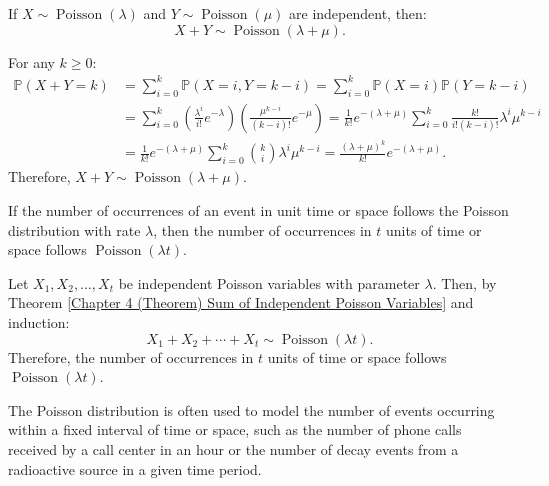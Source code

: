 \documentclass{huhtakm-template-book-v2}
\newcommand{\prob}{\mathbb{P}}
\DeclareMathOperator{\Poisson}{Poisson}
\begin{document}
    \begin{thm}
        \label{Chapter 4 (Theorem) Sum of Independent Poisson Variables}
        If $X \sim \Poisson(\lambda)$ and $Y \sim \Poisson(\mu)$ are independent, then:
        \begin{equation*}
            X+Y \sim \Poisson(\lambda+\mu).
        \end{equation*}
    \end{thm}
    \begin{proofing}
        For any $k \geq 0$:
        \begin{align*}
            \prob(X+Y = k) &= \sum_{i = 0}^{k}\prob(X = i,Y = k-i) = \sum_{i = 0}^{k}\prob(X = i)\prob(Y = k-i)\\
            &= \sum_{i = 0}^{k}\left(\frac{\lambda^{i}}{i!}e^{-\lambda}\right)\left(\frac{\mu^{k-i}}{(k-i)!}e^{-\mu}\right) = \frac{1}{k!}e^{-(\lambda+\mu)}\sum_{i = 0}^{k}\frac{k!}{i!(k-i)!}\lambda^{i}\mu^{k-i}\\
            &= \frac{1}{k!}e^{-(\lambda+\mu)}\sum_{i = 0}^{k}\binom{k}{i}\lambda^{i}\mu^{k-i} = \frac{(\lambda+\mu)^{k}}{k!}e^{-(\lambda+\mu)}.
        \end{align*}
        Therefore, $X+Y \sim \Poisson(\lambda+\mu)$.
    \end{proofing}
    \begin{lem}
        If the number of occurrences of an event in unit time or space follows the Poisson distribution with rate $\lambda$, then the number of occurrences in $t$ units of time or space follows $\Poisson(\lambda t)$.
    \end{lem}
    \begin{proofing}
        Let $X_{1},X_{2},\dots,X_{t}$ be independent Poisson variables with parameter $\lambda$. Then, by Theorem \ref{Chapter 4 (Theorem) Sum of Independent Poisson Variables} and induction:
        \begin{equation*}
            X_{1}+X_{2}+\cdots+X_{t} \sim \Poisson(\lambda t).
        \end{equation*}
        Therefore, the number of occurrences in $t$ units of time or space follows $\Poisson(\lambda t)$.
    \end{proofing}
    \begin{rem}
        The Poisson distribution is often used to model the number of events occurring within a fixed interval of time or space, such as the number of phone calls received by a call center in an hour or the number of decay events from a radioactive source in a given time period.
    \end{rem}
\end{document}
